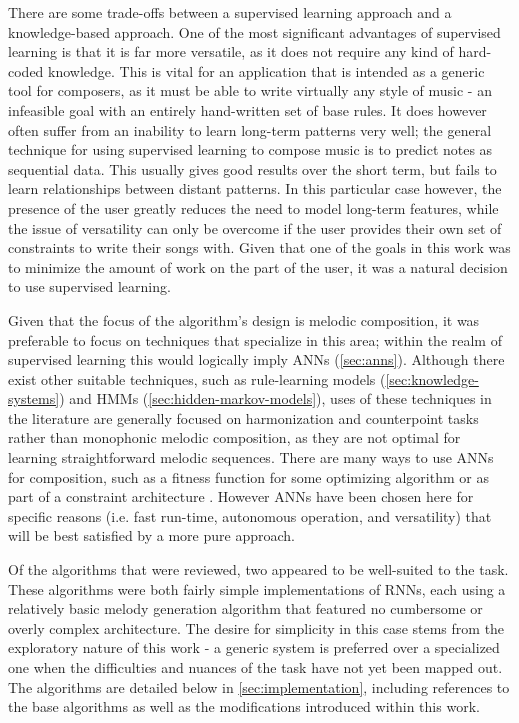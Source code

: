 \documentclass[ author={Stephen Livermore-Tozer},
				supervisor={Dr. Peter Flach},
				degree={MEng},
				title={Algorithmic Co-composition Using Machine Learning},
				subtitle={},
				type={research},
				year={2016} ]{dissertation}
\begin{document}
	There are some trade-offs between a supervised learning approach and a knowledge-based approach. One of the most significant advantages of supervised learning is that it is far more versatile, as it does not require any kind of hard-coded knowledge. This is vital for an application that is intended as a generic tool for composers, as it must be able to write virtually any style of music - an infeasible goal with an entirely hand-written set of base rules. It does however often suffer from an inability to learn long-term patterns very well; the general technique for using supervised learning to compose music is to predict notes as sequential data. This usually gives good results over the short term, but fails to learn relationships between distant patterns. In this particular case however, the presence of the user greatly reduces the need to model long-term features, while the issue of versatility can only be overcome if the user provides their own set of constraints to write their songs with. Given that one of the goals in this work was to minimize the amount of work on the part of the user, it was a natural decision to use supervised learning.
	
	Given that the focus of the algorithm's design is melodic composition, it was preferable to focus on techniques that specialize in this area; within the realm of supervised learning this would logically imply ANNs (\ref{sec:anns}). Although there exist other suitable techniques, such as rule-learning models (\ref{sec:knowledge-systems}) and HMMs (\ref{sec:hidden-markov-models}), uses of these techniques in the literature are generally focused on harmonization and counterpoint tasks rather than monophonic melodic composition, as they are not optimal for learning straightforward melodic sequences. There are many ways to use ANNs for composition, such as a fitness function for some optimizing algorithm \cite{manaris2007corpus} or as part of a constraint architecture \cite{hild1992harmonet}. However ANNs have been chosen here for specific reasons (i.e. fast run-time, autonomous operation, and versatility) that will be best satisfied by a more pure approach.
	
	Of the algorithms that were reviewed, two appeared to be well-suited to the task. These algorithms were both fairly simple implementations of RNNs, each using a relatively basic melody generation algorithm that featured no cumbersome or overly complex architecture. The desire for simplicity in this case stems from the exploratory nature of this work - a generic system is preferred over a specialized one when the difficulties and nuances of the task have not yet been mapped out. The algorithms are detailed below in \ref{sec:implementation}, including references to the base algorithms as well as the modifications introduced within this work.
	
\end{document}

